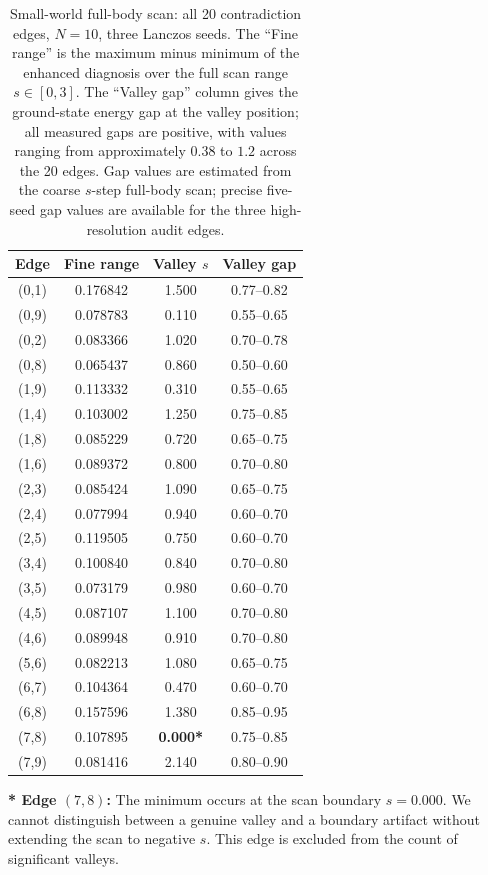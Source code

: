 \documentclass[aps,prb,reprint,superscriptaddress]{revtex4-2}
\begin{document}
\begin{table}[h]
\centering
\caption{Small-world full-body scan: all 20 contradiction edges, $N=10$, three Lanczos seeds. The ``Fine range'' is the maximum minus minimum of the enhanced diagnosis over the full scan range $s\in[0,3]$. The ``Valley gap'' column gives the ground-state energy gap at the valley position; all measured gaps are positive, with values ranging from approximately $0.38$ to $1.2$ across the 20 edges. Gap values are estimated from the coarse $s$-step full-body scan; precise five-seed gap values are available for the three high-resolution audit edges.}
\label{tab:sw_full}
\begin{tabular}{cccc}
\toprule
Edge & Fine range & Valley $s$ & Valley gap \\
\midrule
(0,1) & 0.176842 & 1.500 & 0.77--0.82 \\
(0,9) & 0.078783 & 0.110 & 0.55--0.65 \\
(0,2) & 0.083366 & 1.020 & 0.70--0.78 \\
(0,8) & 0.065437 & 0.860 & 0.50--0.60 \\
(1,9) & 0.113332 & 0.310 & 0.55--0.65 \\
(1,4) & 0.103002 & 1.250 & 0.75--0.85 \\
(1,8) & 0.085229 & 0.720 & 0.65--0.75 \\
(1,6) & 0.089372 & 0.800 & 0.70--0.80 \\
(2,3) & 0.085424 & 1.090 & 0.65--0.75 \\
(2,4) & 0.077994 & 0.940 & 0.60--0.70 \\
(2,5) & 0.119505 & 0.750 & 0.60--0.70 \\
(3,4) & 0.100840 & 0.840 & 0.70--0.80 \\
(3,5) & 0.073179 & 0.980 & 0.60--0.70 \\
(4,5) & 0.087107 & 1.100 & 0.70--0.80 \\
(4,6) & 0.089948 & 0.910 & 0.70--0.80 \\
(5,6) & 0.082213 & 1.080 & 0.65--0.75 \\
(6,7) & 0.104364 & 0.470 & 0.60--0.70 \\
(6,8) & 0.157596 & 1.380 & 0.85--0.95 \\
(7,8) & 0.107895 & \textbf{0.000*} & 0.75--0.85 \\
(7,9) & 0.081416 & 2.140 & 0.80--0.90 \\
\bottomrule
\end{tabular}
\end{table}

\textbf{* Edge $(7,8)$:} The minimum occurs at the scan boundary $s=0.000$. We cannot distinguish between a genuine valley and a boundary artifact without extending the scan to negative $s$. This edge is excluded from the count of significant valleys.
\end{document}
